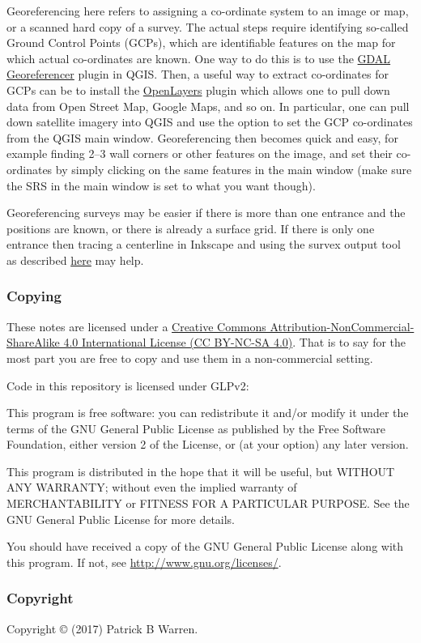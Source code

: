 \documentclass[]{article}
\begin{document}
Georeferencing here refers to assigning a co-ordinate system to an image
or map, or a scanned hard copy of a survey. The actual steps require
identifying so-called Ground Control Points (GCPs), which are
identifiable features on the map for which actual co-ordinates are
known. One way to do this is to use the
\href{https://docs.qgis.org/2.8/en/docs/user_manual/plugins/plugins_georeferencer.html}{GDAL
Georeferencer} plugin in QGIS. Then, a useful way to extract
co-ordinates for GCPs can be to install the
\href{https://plugins.qgis.org/plugins/openlayers_plugin/}{OpenLayers}
plugin which allows one to pull down data from Open Street Map, Google
Maps, and so on. In particular, one can pull down satellite imagery into
QGIS and use the option to set the GCP co-ordinates from the QGIS main
window. Georeferencing then becomes quick and easy, for example finding
2--3 wall corners or other features on the image, and set their
co-ordinates by simply clicking on the same features in the main window
(make sure the SRS in the main window is set to what you want though).

Georeferencing surveys may be easier if there is more than one entrance
and the positions are known, or there is already a surface grid. If
there is only one entrance then tracing a centerline in Inkscape and
using the survex output tool as described
\href{https://github.com/patrickbwarren/inkscape-survex-export}{here}
may help.

\subsubsection{Copying}\label{copying}

These notes are licensed under a
\href{https://creativecommons.org/licenses/by-nc-sa/4.0/}{Creative
Commons Attribution-NonCommercial-ShareAlike 4.0 International License
(CC BY-NC-SA 4.0)}. That is to say for the most part you are free to
copy and use them in a non-commercial setting.

Code in this repository is licensed under GLPv2:

This program is free software: you can redistribute it and/or modify it
under the terms of the GNU General Public License as published by the
Free Software Foundation, either version 2 of the License, or (at your
option) any later version.

This program is distributed in the hope that it will be useful, but
WITHOUT ANY WARRANTY; without even the implied warranty of
MERCHANTABILITY or FITNESS FOR A PARTICULAR PURPOSE. See the GNU General
Public License for more details.

You should have received a copy of the GNU General Public License along
with this program. If not, see \url{http://www.gnu.org/licenses/}.

\subsubsection{Copyright}\label{copyright}

Copyright © (2017) Patrick B Warren.
\end{document}
